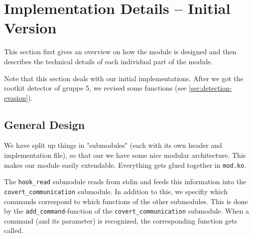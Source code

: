 \documentclass[10pt, letterpaper]{scrartcl}
\begin{document}
\section{Implementation Details -- Initial Version}
\label{sec:implementation}

This section first gives an overview on how the module is designed and then describes the technical details of each individual part of the module. 

Note that this section deals with our initial implementations. After we got the rootkit detector of gruppe 5, we revised some functions (see \autoref{sec:detection-evasion}).

\subsection{General Design}
\label{sec:general_design}
We have split up things in "submodules" (each with its own header and implementation file), so
that our we have some nice modular architecture. This makes our module easily extendable. Everything gets glued together in \texttt{mod.ko}.

The \texttt{hook\_read} submodule reads from stdin and feeds this information into the \linebreak \texttt{covert\_communication} submodule. In addition to this, we specifiy which commands correspond to which functions of the other submodules. This is done by the \texttt{add\_command}-function of the  \texttt{covert\_communication} submodule. When a command (and its parameter) is recognized, the corresponding function gets called.
\end{document}
